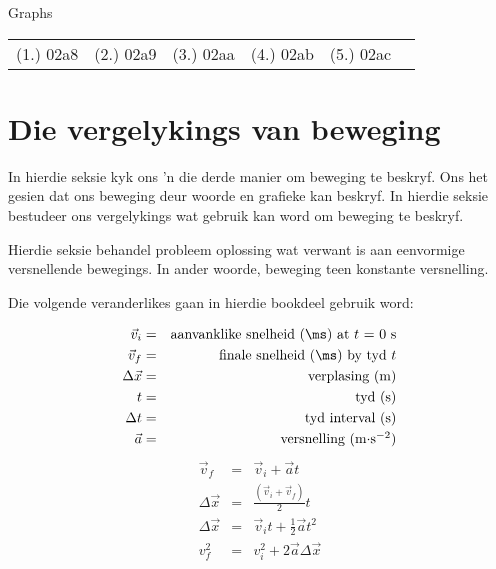 \begin{exercises}{Graphs}
\par \practiceinfo
\par \begin{tabular}[h]{cccccc}
(1.)	02a8	&
(2.)	02a9	&
(3.)	02aa	&
(4.)	02ab	&
(5.)	02ac	&
\end{tabular}
\end{exercises}


\section{Die vergelykings van beweging}
    \nopagebreak
      
In hierdie seksie kyk ons 'n die derde manier om beweging te beskryf. Ons het gesien dat ons beweging deur woorde en grafieke kan beskryf. In hierdie seksie bestudeer ons vergelykings wat gebruik kan word om beweging te beskryf.\par

Hierdie seksie behandel probleem oplossing wat verwant is aan eenvormige versnellende bewegings. In ander woorde, beweging teen konstante versnelling.

Die volgende veranderlikes gaan in hierdie bookdeel gebruik word:\par      
      
\label{m38796*id75611}\nopagebreak\noindent{}
\begin{eqnarray*}
\vec{v}_i &=& \mbox{aanvanklike snelheid (\ms) at $t$ = 0 s} \\
\vec{v}_f &=& \mbox{finale snelheid (\ms) by tyd $t$}\\
\Delta \vec{x} &=& \mbox{verplasing (m)} \\
t &=& \mbox{tyd (s)} \\
\Delta t &=& \mbox{tyd interval (s)} \\
\vec{a} &=& \mbox{versnelling (m$\cdot$s$^{-2}$)}
\end{eqnarray*}
      \label{m38796*eip-506}\nopagebreak\noindent{}
\begin{eqnarray}
\vec{v}_f &=& \vec{v}_i + \vec{a}t \label{eq:eq1}\\
\Delta \vec{x} &=& \frac{(\vec{v}_i + \vec{v}_f)}{2} t\label{eq:eq2}\\
\Delta \vec{x} &=& \vec{v}_it + \frac{1}{2}\vec{a}t^2 \label{eq:eq3}\\
v_f^2 &=& v_i^2 + 2\vec{a} \Delta \vec{x} \label{eq:eq4}
\end{eqnarray}

